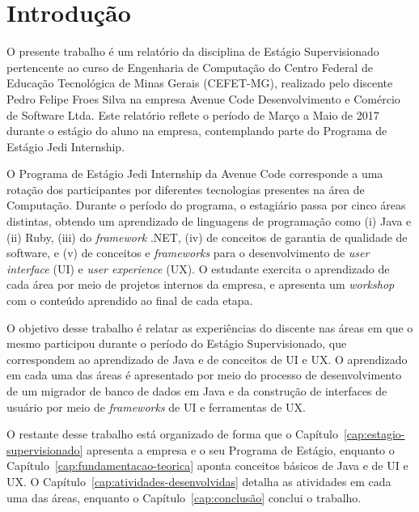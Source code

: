 \chapter{Introdução}
\label{cap:introducao}

O presente trabalho é um relatório da disciplina de Estágio Supervisionado pertencente ao curso de Engenharia de Computação do Centro Federal de Educação Tecnológica de Minas Gerais (CEFET-MG), realizado pelo discente Pedro Felipe Froes Silva na empresa Avenue Code Desenvolvimento e Comércio de Software Ltda. Este relatório reflete o período de Março a Maio de 2017 durante o estágio do aluno na empresa, contemplando parte do Programa de Estágio Jedi Internship.

O Programa de Estágio Jedi Internship da Avenue Code corresponde a uma rotação dos participantes por diferentes tecnologias presentes na área de Computação. Durante o período do programa, o estagiário passa por cinco áreas distintas, obtendo um aprendizado de linguagens de programação como (i) Java e (ii) Ruby, (iii) do \textit{framework} .NET, (iv) de conceitos de garantia de qualidade de software, e (v) de conceitos e \textit{frameworks} para o desenvolvimento de \textit{user interface} (UI) e \textit{user experience} (UX). O estudante exercita o aprendizado de cada área por meio de projetos internos da empresa, e apresenta um \textit{workshop} com o conteúdo aprendido ao final de cada etapa.

O objetivo desse trabalho é relatar as experiências do discente nas áreas em que o mesmo participou durante o período do Estágio Supervisionado, que correspondem ao aprendizado de Java e de conceitos de UI e UX. O aprendizado em cada uma das áreas é apresentado por meio do processo de desenvolvimento de um migrador de banco de dados em Java e da construção de interfaces de usuário por meio de \textit{frameworks} de UI e ferramentas de UX.

O restante desse trabalho está organizado de forma que o Capítulo~\ref{cap:estagio-supervisionado} apresenta a empresa e o seu Programa de Estágio, enquanto o Capítulo~\ref{cap:fundamentacao-teorica} aponta conceitos básicos de Java e de UI e UX. O Capítulo~\ref{cap:atividades-desenvolvidas} detalha as atividades em cada uma das áreas, enquanto o Capítulo~\ref{cap:conclusão} conclui o trabalho.
